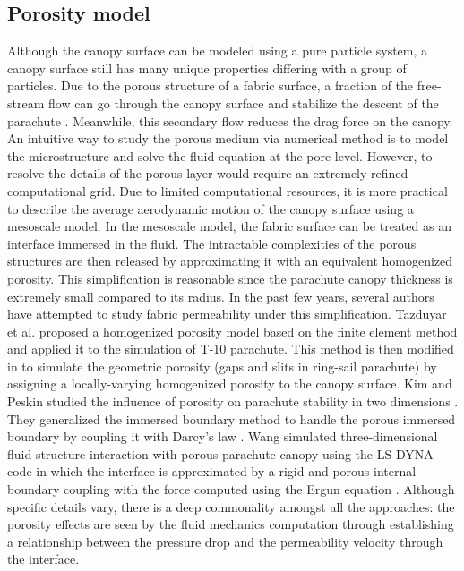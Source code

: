\subsection{Porosity model}
Although the canopy surface can be modeled using a pure particle system, a canopy surface still has many unique properties differing with a group of particles. 
Due to the porous structure of a
fabric surface, a fraction of the free-stream flow can go through the canopy
surface and stabilize the descent of the parachute \cite{Johari05}. 
Meanwhile, this secondary flow reduces the drag force on the canopy. 
An intuitive way to study the porous medium via numerical method is to model the microstructure and solve the fluid equation at the pore level. However, to resolve the details of the porous layer would require an extremely 
refined computational grid. Due to limited computational resources, it 
is more practical to describe the average aerodynamic motion of the 
canopy surface using a mesoscale model. In the mesoscale model, the 
fabric surface can be treated as an interface immersed in the fluid.
The intractable complexities of the porous structures are then released by 
approximating it with an equivalent homogenized porosity.  
This simplification is reasonable since the parachute canopy thickness is
extremely small compared to its radius. In the past few years, 
several authors have attempted to study fabric permeability
under this simplification. Tazduyar et al. \cite{TezduyarSathe2007IJNMF} proposed a
homogenized porosity model based on the finite element method and applied it 
to the simulation of T-10 parachute. This method is then modified in \cite{Takizawa2012ACME}
to simulate the geometric porosity (gaps and slits in ring-sail parachute) by assigning a locally-varying homogenized porosity to the canopy surface. 
Kim and Peskin studied the influence of porosity on
parachute stability in two dimensions \cite{kim2006twodim}. They generalized
the immersed boundary method to handle the porous immersed boundary by 
coupling it with Darcy's law \cite{nield2013}.  Wang \cite{wang2006porous} simulated 
three-dimensional fluid-structure interaction with porous parachute canopy using the
LS-DYNA code in which the interface is approximated by a rigid and porous
internal boundary coupling with the force computed using the Ergun equation \cite{nield2013}. Although specific details vary, there is a deep commonality amongst all the approaches: the porosity effects are seen by the fluid mechanics computation through establishing a relationship between the pressure drop and the permeability velocity through the interface.

